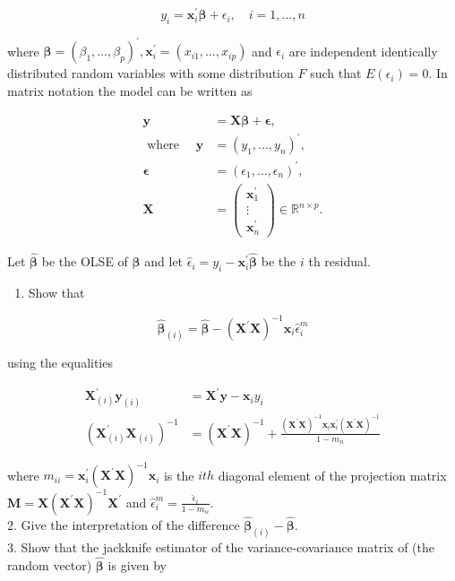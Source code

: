 $$
y_{i}=\mathbf{x}_{i}^{\prime} \boldsymbol{\beta}+\epsilon_{i}, \quad i=1, \ldots, n
$$

where $\boldsymbol{\beta}=\left(\beta_{1}, \ldots, \beta_{p}\right)^{\prime}, \mathbf{x}_{i}^{\prime}=\left(x_{i 1}, \ldots, x_{i p}\right)$ and $\epsilon_{i}$ are independent identically distributed random variables with some distribution $F$ such that $E\left(\epsilon_{i}\right)=0$. In matrix notation the model can be written as

$$
\begin{aligned}
\mathbf{y} & =\mathbf{X} \boldsymbol{\beta}+\boldsymbol{\epsilon}, \\
\text { where } \quad \mathbf{y} & =\left(y_{1}, \ldots, y_{n}\right)^{\prime}, \\
\boldsymbol{\epsilon} & =\left(\epsilon_{1}, \ldots, \epsilon_{n}\right)^{\prime}, \\
\mathbf{X} & =\left(\begin{array}{c}
\mathbf{x}_{1}^{\prime} \\
\vdots \\
\mathbf{x}_{n}^{\prime}
\end{array}\right) \in \mathbb{R}^{n \times p} .
\end{aligned}
$$

Let $\hat{\boldsymbol{\beta}}$ be the OLSE of $\boldsymbol{\beta}$ and let $\hat{\epsilon}_{i}=y_{i}-\mathbf{x}_{i}^{\prime} \hat{\boldsymbol{\beta}}$ be the $i$ th residual.

\begin{enumerate}
  \item Show that
\end{enumerate}

$$
\hat{\boldsymbol{\beta}}_{(i)}=\hat{\boldsymbol{\beta}}-\left(\mathbf{X}^{\prime} \mathbf{X}\right)^{-1} \mathbf{x}_{i} \hat{\epsilon}_{i}^{m}
$$

using the equalities

$$
\begin{aligned}
\mathbf{X}_{(i)}^{\prime} \mathbf{y}_{(i)} & =\mathbf{X}^{\prime} \mathbf{y}-\mathbf{x}_{i} y_{i} \\
\left(\mathbf{X}_{(i)}^{\prime} \mathbf{X}_{(i)}\right)^{-1} & =\left(\mathbf{X}^{\prime} \mathbf{X}\right)^{-1}+\frac{\left(\mathbf{X}^{\prime} \mathbf{X}\right)^{-1} \mathbf{x}_{i} \mathbf{x}_{i}^{\prime}\left(\mathbf{X}^{\prime} \mathbf{X}\right)^{-1}}{1-m_{i i}}
\end{aligned}
$$

where $m_{i i}=\mathbf{x}_{i}^{\prime}\left(\mathbf{X}^{\prime} \mathbf{X}\right)^{-1} \mathbf{x}_{i}$ is the $i t h$ diagonal element of the projection matrix $\mathbf{M}=\mathbf{X}\left(\mathbf{X}^{\prime} \mathbf{X}\right)^{-1} \mathbf{X}^{\prime}$ and $\hat{\epsilon}_{i}^{m}=\frac{\hat{\epsilon}_{i}}{1-m_{i i}}$.\\
2. Give the interpretation of the difference $\hat{\boldsymbol{\beta}}_{(i)}-\hat{\boldsymbol{\beta}}$.\\
3. Show that the jackknife estimator of the variance-covariance matrix of (the random vector) $\hat{\boldsymbol{\beta}}$ is given by


